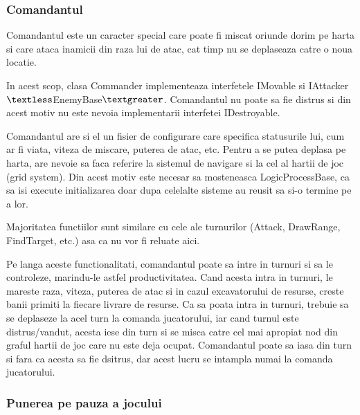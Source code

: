 \documentclass[12pt, a4paper]{article}
\begin{document}
	
	
	
	
	\subsubsection{Comandantul}
	\label{section: commander}
	
	Comandantul este un caracter special care poate fi miscat oriunde dorim pe harta si care ataca inamicii din raza lui de atac, cat timp nu se deplaseaza catre o noua locatie.
	\newline
	
	In acest scop, clasa Commander implementeaza interfetele IMovable si IAttacker$\textless$EnemyBase$\textgreater$. Comandantul nu poate sa fie distrus si din acest motiv nu este nevoia implementarii interfetei IDestroyable.
	\newline
	
	Comandantul are si el un fisier de configurare care specifica statusurile lui, cum ar fi viata, viteza de miscare, puterea de atac, etc. Pentru a se putea deplasa pe harta, are nevoie sa faca referire la sistemul de navigare si la cel al hartii de joc (grid system). Din acest motiv este necesar sa mosteneasca LogicProcessBase, ca sa isi execute initializarea doar dupa celelalte sisteme au reusit sa si-o termine pe a lor.
	\newline
	
	Majoritatea functiilor sunt similare cu cele ale turnurilor (Attack, DrawRange, FindTarget, etc.) asa ca nu vor fi reluate aici. 
	\newline
	
	Pe langa aceste functionalitati, comandantul poate sa intre in turnuri si sa le controleze, marindu-le astfel productivitatea. Cand acesta intra in turnuri, le mareste raza, viteza, puterea de atac si in cazul excavatorului de resurse, creste banii primiti la fiecare livrare de resurse. Ca sa poata intra in turnuri, trebuie sa se deplaseze la acel turn la comanda jucatorului, iar cand turnul este distrus/vandut, acesta iese din turn si se misca catre cel mai apropiat nod din graful hartii de joc care nu este deja ocupat. Comandantul poate sa iasa din turn si fara ca acesta sa fie dsitrus, dar acest lucru se intampla numai la comanda jucatorului.
	
	
	
	
	
	\subsubsection{Punerea pe pauza a jocului}
	
\end{document}
